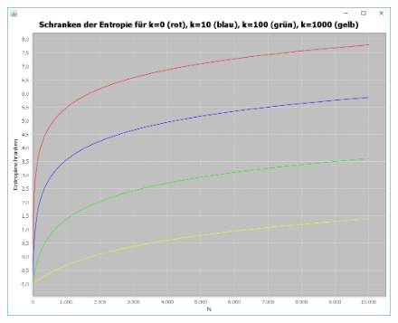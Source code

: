 \documentclass[a4paper,12pt]{article}
\begin{document}
\begin{figure}
	    \centering
				     \includegraphics[width=\textwidth, height = 0.5\textheight]{Entropieschranken}
\end{figure}
\newpage
\end{document}
